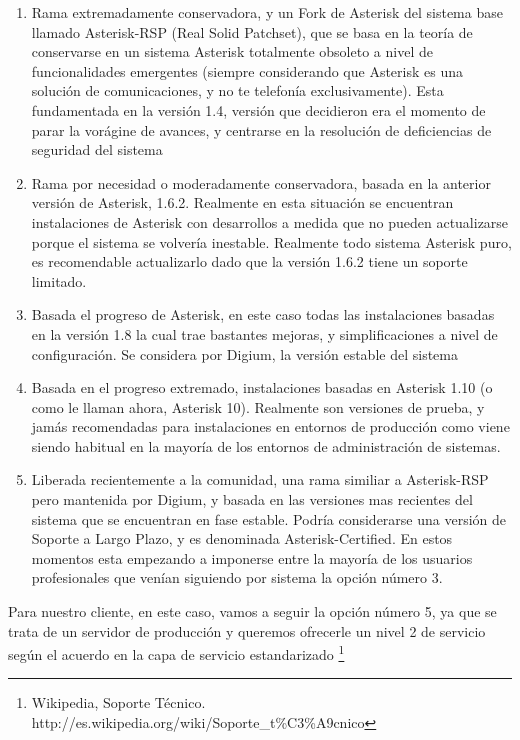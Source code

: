 \begin{enumerate}

\item Rama extremadamente conservadora, y un Fork de Asterisk del sistema base llamado Asterisk-RSP (Real Solid Patchset), que se basa en la teoría de conservarse en un sistema Asterisk totalmente obsoleto a nivel de funcionalidades emergentes (siempre considerando que Asterisk es una solución de comunicaciones, y no te telefonía exclusivamente). Esta fundamentada en la versión 1.4, versión que decidieron era el momento de parar la vorágine de avances, y centrarse en la resolución de deficiencias de seguridad del sistema
\item Rama por necesidad o moderadamente conservadora, basada en la anterior versión de Asterisk, 1.6.2. Realmente en esta situación se encuentran instalaciones de Asterisk con desarrollos a medida que no pueden actualizarse porque el sistema se volvería inestable. Realmente todo sistema Asterisk puro, es recomendable actualizarlo dado que la versión 1.6.2 tiene un soporte limitado.
\item Basada el progreso de Asterisk, en este caso todas las instalaciones basadas en la versión 1.8 la cual trae bastantes mejoras, y simplificaciones a nivel de configuración. Se considera por Digium, la versión estable del sistema
\item Basada en el progreso extremado, instalaciones basadas en Asterisk 1.10 (o como le llaman ahora, Asterisk 10). Realmente son versiones de prueba, y jamás recomendadas para instalaciones en entornos de producción como viene siendo habitual en la mayoría de los entornos de administración de sistemas.
\item Liberada recientemente a la comunidad, una rama similiar a Asterisk-RSP pero mantenida por Digium, y basada en las versiones mas recientes del sistema que se encuentran en fase estable. Podría considerarse una versión de Soporte a Largo Plazo, y es denominada Asterisk-Certified. En estos momentos esta empezando a imponerse entre la mayoría de los usuarios profesionales que venían siguiendo por sistema la opción número 3.

\end{enumerate}

Para nuestro cliente, en este caso, vamos a seguir la opción número 5, ya que se trata de un servidor de producción y queremos ofrecerle un nivel 2 de servicio según el acuerdo en la capa de servicio estandarizado \footnote{Wikipedia, Soporte Técnico. http://es.wikipedia.org/wiki/Soporte\_t\%C3\%A9cnico}

